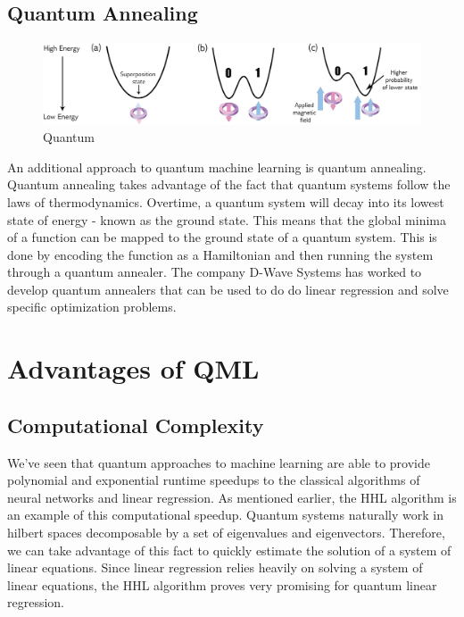 \documentclass[12pt]{article}
\begin{document}
\subsection*{Quantum Annealing}
\begin{figure}[h]
\centering
\includegraphics[width=1\textwidth]{QuantumAnnealing.png}
\caption{Quantum }
\end{figure}
An additional approach to quantum machine learning is quantum annealing. Quantum annealing takes advantage of the fact that quantum systems follow the laws of thermodynamics. Overtime, a quantum system will decay into its lowest state of energy - known as the ground state. This means that the global minima of a function can be mapped to the ground state of a quantum system. This is done by encoding the function as a Hamiltonian and then running the system through a quantum annealer. The company D-Wave Systems has worked to develop quantum annealers that can be used to do do linear regression and solve specific optimization problems.\cite{adachi_henderson_2021} \cite{date_potok_2021}





\section*{Advantages of QML}
\subsection*{Computational Complexity}
We've seen that quantum approaches to machine learning are able to provide polynomial and exponential runtime speedups to the classical algorithms of neural networks and linear regression. As mentioned earlier, the HHL algorithm is an example of this computational speedup. Quantum systems naturally work in hilbert spaces decomposable by a set of eigenvalues and eigenvectors. Therefore, we can take advantage of this fact to quickly estimate the solution of a system of linear equations. Since linear regression relies heavily on solving a system of linear equations, the HHL algorithm proves very promising for quantum linear regression.
\end{document}
